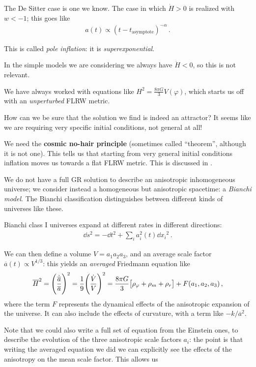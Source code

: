 \documentclass[main.tex]{subfiles}
\begin{document}
The De Sitter case is one we know. 
The case in which \(\dot{H} >0\) is realized with \(w < -1\); this goes like 
%
\begin{align}
a(t ) \propto (t-t _{\text{asymptote}})^{-\alpha } 
\,.
\end{align}
%

This is called \emph{pole inflation}: it is \emph{superexponential}. 

In the simple models we are considering we always have \(\dot{H} < 0 \), so this is not relevant. 

We have always worked with equations like \(H^2 = \frac{8 \pi G}{3} V(\varphi )\), which starts us off with an \emph{unperturbed} FLRW metric.

How can we be sure that the solution we find is indeed an attractor? It seems like we are requiring very specific initial conditions, not general at all! 

We need the \textbf{cosmic no-hair principle} (sometimes called ``theorem'', although it is not one).
This tells us that starting from very general initial conditions inflation moves us towards a flat FLRW metric. 
This is discussed in \textcite[]{kolbEarlyUniverse1994}. 

We do not have a full GR solution to describe an anisotropic inhomogeneous universe; we consider instead a homogeneous but anisotropic spacetime: a \emph{Bianchi model}. 
The Bianchi classification distinguishes between different kinds of universes like these. 

Bianchi class I universes expand at different rates in different directions: 
%
\begin{align}
\dd{s^2} = - \dd{t}^2 + \sum _{i} a_i^2 (t) \dd{x_i}^2
\,.
\end{align}

We can then define a volume \(V = a_1 a_2 a_3 \), and an average scale factor \(\overline{a} (t) \propto V^{1/3}\): this yields an \emph{averaged} Friedmann equation like 
%
\begin{align}
\overline{H}^2 = \qty(\frac{\dot{\overline{a}}}{\overline{a}})^2 = \frac{1}{9} \qty(\frac{\dot{V}}{V})^2
 = \frac{8 \pi G}{3} \qty[\rho _\varphi + \rho _m + \rho _r]
 + F(a_1, a_2, a_3 )
\,,
\end{align}
%
where the term \(F\) represents the dynamical effects of the anisotropic expansion of the universe. 
It can also include the effects of curvature, with a term like \(- k / \overline{a}^2\).

Note that we could also write a full set of equation from the Einstein ones, to describe the evolution of the three anisotropic scale factors \(a_i\): the point is that writing the averaged equation we did we can explicitly see the effects of the anisotropy on the mean scale factor. This allows us 
\end{document}
